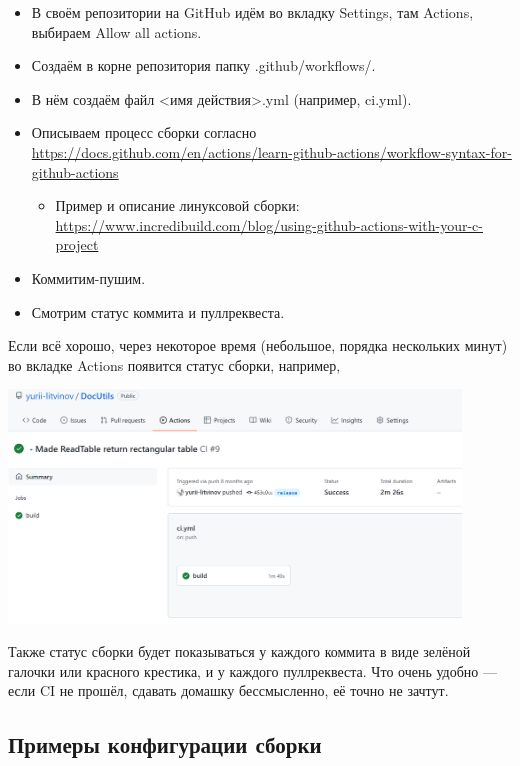 \documentclass[a5paper]{article}
\begin{document}
\begin{itemize}
    \item В своём репозитории на GitHub идём во вкладку Settings, там Actions, выбираем Allow all actions.
    \item Создаём в корне репозитория папку .github/workflows/.
    \item В нём создаём файл <имя действия>.yml (например, ci.yml).
    \item Описываем процесс сборки согласно \url{https://docs.github.com/en/actions/learn-github-actions/workflow-syntax-for-github-actions}
    \begin{itemize}
        \item Пример и описание линуксовой сборки: \url{https://www.incredibuild.com/blog/using-github-actions-with-your-c-project}
    \end{itemize}
    \item Коммитим-пушим.
    \item Смотрим статус коммита и пуллреквеста.
\end{itemize}

Если всё хорошо, через некоторое время (небольшое, порядка нескольких минут) во вкладке Actions появится статус сборки, например,

\begin{center}
    \includegraphics[width=0.9\textwidth]{githubActionsBuildStatus.png}
\end{center}

Также статус сборки будет показываться у каждого коммита в виде зелёной галочки или красного крестика, и у каждого пуллреквеста. Что очень удобно --- если CI не прошёл, сдавать домашку бессмысленно, её точно не зачтут.

\subsection{Примеры конфигурации сборки}
\end{document}
